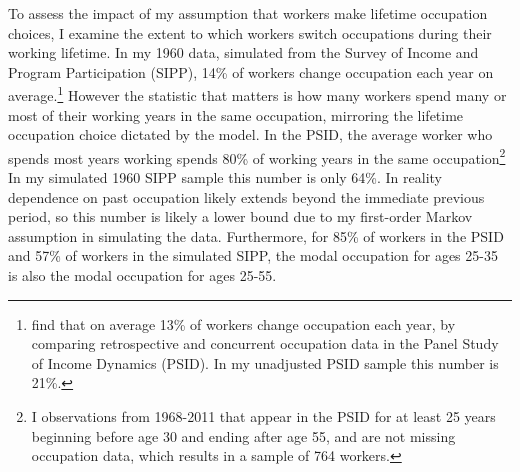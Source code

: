 \documentclass[12pt]{article}
\begin{document}



To assess the impact of my assumption that workers make lifetime occupation choices, I examine the extent to which workers switch occupations during their working lifetime. In my 1960 data, simulated from the Survey of Income and Program Participation (SIPP), 14\% of workers change occupation each year on average.\footnote{ find that on average 13\% of workers change occupation each year, by comparing retrospective and concurrent occupation data in the Panel Study of Income Dynamics (PSID). In my unadjusted PSID sample this number is 21\%.} However the statistic that matters is how many workers spend many or most of their working years in the same occupation, mirroring the lifetime occupation choice dictated by the model.  In the PSID, the average worker who spends most years working spends 80\% of working years in the same occupation\footnote{I observations from 1968-2011 that appear in the PSID for at least 25 years beginning before age 30 and ending after age 55, and are not missing occupation data, which results in a sample of 764 workers.} In my simulated 1960 SIPP sample this number is only 64\%. In reality dependence on past occupation likely extends beyond the immediate previous period, so this number is likely a lower bound due to my first-order Markov assumption in simulating the data. Furthermore, for 85\% of workers in the PSID and 57\% of workers in the simulated SIPP, the modal occupation for ages 25-35 is also the modal occupation for ages 25-55.
\end{document}
